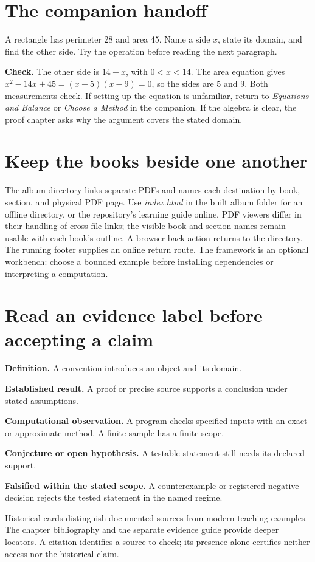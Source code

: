 \documentclass[14pt,oneside]{extbook}
\newcommand{\claimstatus}[2]{\par\noindent\textsf{\textbf{#1.}} #2\par}
\theoremstyle{definition}
\begin{document}
\section*{The companion handoff}
A rectangle has perimeter 28 and area 45. Name a side $x$, state its domain,
and find the other side. Try the operation before reading the next paragraph.
\par\textbf{Check.} The other side is $14-x$, with $0<x<14$.
The area equation gives $x^2-14x+45=(x-5)(x-9)=0$, so the sides are
5 and 9. Both measurements check. If setting up the equation is unfamiliar,
return to \emph{Equations and Balance} or \emph{Choose a Method} in the
companion. If the algebra is clear, the proof chapter asks why the argument
covers the stated domain.

\section*{Keep the books beside one another}
The album directory links separate PDFs and names each destination by book,
section, and physical PDF page. Use \emph{index.html} in the built album folder
for an offline directory, or the repository's learning guide online.
PDF viewers differ in their handling of cross-file links; the visible book and
section names remain usable with each book's outline. A browser back action
returns to the directory. The running footer supplies an online return route.
The framework is an optional workbench: choose a bounded example before
installing dependencies or interpreting a computation.



\section*{Read an evidence label before accepting a claim}
\claimstatus{Definition}{A convention introduces an object and its domain.}
\claimstatus{Established result}{A proof or precise source supports a conclusion
under stated assumptions.}
\claimstatus{Computational observation}{A program checks specified inputs with
an exact or approximate method. A finite sample has a finite scope.}
\claimstatus{Conjecture or open hypothesis}{A testable statement still needs its
declared support.}
\claimstatus{Falsified within the stated scope}{A counterexample or registered
negative decision rejects the tested statement in the named regime.}
Historical cards distinguish documented sources from modern teaching examples.
The chapter bibliography and the separate evidence guide provide deeper locators.
A citation identifies a source to check; its presence alone certifies neither
access nor the historical claim.
\end{document}
